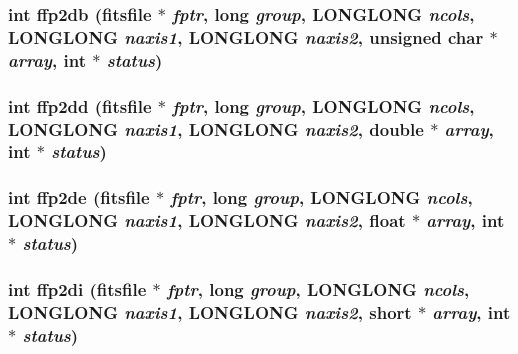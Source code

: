 \subsubsection{\setlength{\rightskip}{0pt plus 5cm}int ffp2db (\bf{fitsfile} $\ast$ {\em fptr}, long {\em group}, \bf{LONGLONG} {\em ncols}, \bf{LONGLONG} {\em naxis1}, \bf{LONGLONG} {\em naxis2}, unsigned char $\ast$ {\em array}, int $\ast$ {\em status})}\label{test_2shm__client_2fitsio_8h_8e43e1cab4a5cdaa87d44ed10bd52298}


\subsubsection{\setlength{\rightskip}{0pt plus 5cm}int ffp2dd (\bf{fitsfile} $\ast$ {\em fptr}, long {\em group}, \bf{LONGLONG} {\em ncols}, \bf{LONGLONG} {\em naxis1}, \bf{LONGLONG} {\em naxis2}, double $\ast$ {\em array}, int $\ast$ {\em status})}\label{test_2shm__client_2fitsio_8h_8add04b815d7489f9beeb3dd43857843}


\subsubsection{\setlength{\rightskip}{0pt plus 5cm}int ffp2de (\bf{fitsfile} $\ast$ {\em fptr}, long {\em group}, \bf{LONGLONG} {\em ncols}, \bf{LONGLONG} {\em naxis1}, \bf{LONGLONG} {\em naxis2}, float $\ast$ {\em array}, int $\ast$ {\em status})}\label{test_2shm__client_2fitsio_8h_d22120fc89698ea1c5d54ec66c038dce}


\subsubsection{\setlength{\rightskip}{0pt plus 5cm}int ffp2di (\bf{fitsfile} $\ast$ {\em fptr}, long {\em group}, \bf{LONGLONG} {\em ncols}, \bf{LONGLONG} {\em naxis1}, \bf{LONGLONG} {\em naxis2}, short $\ast$ {\em array}, int $\ast$ {\em status})}\label{test_2shm__client_2fitsio_8h_0fa81f7a8cdf97afcb174e6dc024f080}



